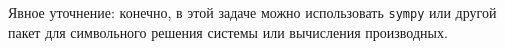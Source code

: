 \begin{enumerate}
Явное уточнение: конечно, в этой задаче можно использовать \verb|sympy| или другой пакет для символьного решения системы или вычисления производных. 

\end{enumerate}

